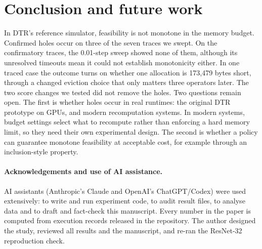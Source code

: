 \documentclass[11pt]{article}
\begin{document}
\section{Conclusion and future work}
In DTR's reference simulator, feasibility is not monotone in the memory budget. Confirmed
holes occur on three of the seven traces we swept. On the confirmatory traces, the 0.01-step
sweep showed none of them, although its unresolved timeouts mean it could not establish
monotonicity either. In one
traced case the outcome turns on whether one allocation is 173{,}479 bytes short, through a
changed eviction choice that only matters three operators later. The two score changes we
tested did not remove the holes. Two questions remain open. The first is
whether holes occur in real runtimes: the original DTR prototype on GPUs, and modern
recomputation systems. In modern systems, budget settings select what to recompute rather
than enforcing a hard memory limit, so they need their own experimental design. The second
is whether a policy can guarantee monotone feasibility at acceptable cost, for example
through an inclusion-style property.

\paragraph{Acknowledgements and use of AI assistance.} AI assistants (Anthropic's Claude and
OpenAI's ChatGPT/Codex) were used extensively: to write and run experiment code, to audit
result files, to analyse data and to draft and fact-check this manuscript. Every number in
the paper is computed from execution records released in the repository. The author designed the study,
reviewed all results and the manuscript, and re-ran the ResNet-32 reproduction check.
\end{document}
